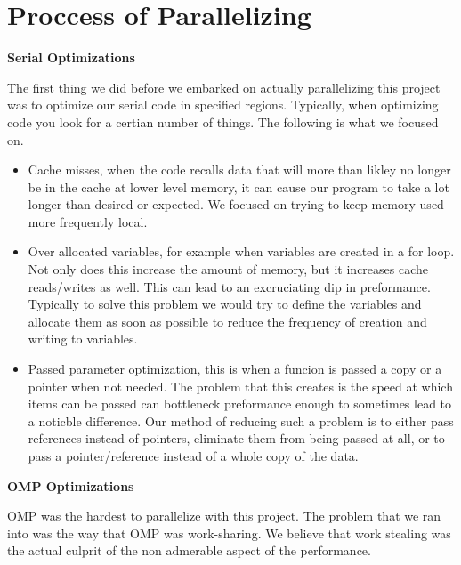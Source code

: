 \chapter*{Proccess of Parallelizing}

\begin{center}
    \Large\textbf{Serial Optimizations}\\
\end{center}
    The first thing we did before we embarked on actually parallelizing this project was to optimize our serial code in specified regions. Typically, when optimizing code you look for a certian number of things. The following is what we focused on. 

\begin{itemize}
    \item Cache misses, when the code recalls data that will more than likley no longer be in the cache at lower level memory, it can cause our program to take a lot longer than desired or expected. We focused on trying to keep memory used more frequently local.  
    \item Over allocated variables, for example when variables are created in a for loop. Not only does this increase the amount of memory, but it increases cache reads/writes as well. This can lead to an excruciating dip in preformance. Typically to solve this problem we would try to define the variables and allocate them as soon as possible to reduce the frequency of creation and writing to variables.
    \item Passed parameter optimization, this is when a funcion is passed a copy or a pointer when not needed. The problem that this creates is the speed at which items can be passed can bottleneck preformance enough to sometimes lead to a noticble difference. Our method of reducing such a problem is to either pass references instead of pointers, eliminate them from being passed at all, or to pass a pointer/reference instead of a whole copy of the data.
\end{itemize}


\begin{center}
    \vspace{20mm}
    \Large\textbf{OMP Optimizations}\\
\end{center}

    OMP was the hardest to parallelize with this project. The problem that we ran into was the way that OMP was work-sharing. We believe that work stealing was the actual culprit of the non admerable aspect of the performance.

